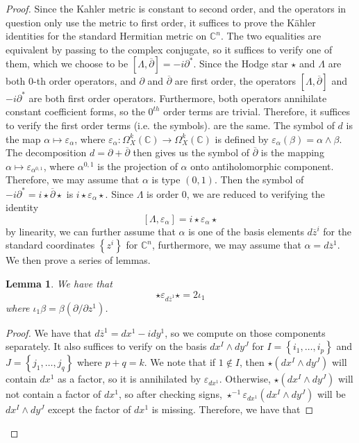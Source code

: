 \documentclass[psamsfonts, 12pt]{amsart}
\newtheorem{lem}[thm]{Lemma}
\theoremstyle{definition}
\theoremstyle{remark}
\newcommand{\C}{\mathbb{C}}
\newcommand{\dbar}{\overline{\partial}}
\newcommand{\zbar}{\overline{z}}
\newcommand{\inv}{^{-1}}
\newcommand{\set}[1]{\left\lbrace #1 \right\rbrace}
\begin{document}
\begin{proof}
Since the Kahler metric is constant to second order, and the operators in question only
use the metric to first order, it suffices to prove the K\"ahler identities for the
standard Hermitian metric on $\C^n$. The two equalities are equivalent by passing to
the complex conjugate, so it suffices to verify one of them, which we choose to
be $[\Lambda, \dbar] = -i\partial^*$. Since the Hodge star $\star$ and $\Lambda$ are
both $0$-th order operators, and $\partial$ and $\dbar$ are first order, the operators
$[\Lambda,\dbar]$ and $-i\partial^*$ are both first order operators. Furthermore, both
operators annihilate constant coefficient forms, so the $0^{th}$ order terms are
trivial. Therefore, it suffices to verify the first order terms (i.e. the symbols).
are the same. The symbol of $d$ is the map $\alpha \mapsto \varepsilon_\alpha$, where
$\varepsilon_\alpha: \Omega^k_X(\C) \to \Omega^k_X(\C)$ is defined by
$\varepsilon_\alpha(\beta) = \alpha\wedge\beta$. The decomposition
$d = \partial + \dbar$ then gives us the symbol of $\dbar$ is the mapping
$\alpha \mapsto \varepsilon_{\alpha^{0,1}}$, where $\alpha^{0,1}$ is the projection of
$\alpha$ onto antiholomorphic component. Therefore, we may assume that $\alpha$ is type
$(0,1)$. Then the symbol of $-i\partial^* = i\star\dbar\star$ is
$i\star\varepsilon_\alpha\star$. Since $\Lambda$ is order $0$, we are reduced
to verifying the identity
\[
[\Lambda,\varepsilon_\alpha] = i\star\varepsilon_\alpha\star
\]
by linearity, we can further assume that $\alpha$ is one of the basis elements
$d\zbar^i$ for the standard coordinates $\set{z^i}$ for $\C^n$, furthermore, we may
assume that $\alpha = d\zbar^1$. We then prove a series of lemmas.
%
\begin{lem}
We have that
\[
\star\varepsilon_{d\zbar^1}\star = 2\iota_1
\]
where $\iota_1\beta = \beta(\partial/\partial z^1)$.
\end{lem}
%
\begin{proof}
We have that $d\zbar^1 = dx^1 - idy^1$, so we compute on those components separately.
It also suffices to verify on the basis $dx^I \wedge dy^J$ for
$I = \set{i_1,\ldots, i_p}$ and $J = \set{j_1,\ldots, j_q}$ where $p+q=k$. We note that
if $1 \notin I$, then $\star(dx^I \wedge dy^J)$ will contain $dx^1$ as a factor,
so it is annihilated by $\varepsilon_{dx^1}$. Otherwise, $\star(dx^I\wedge dy^J)$ will
not contain a factor of $dx^1$, so after checking signs,
$\star\inv\varepsilon_{dx^1}(dx^I\wedge dy^J)$ will be $dx^I \wedge dy^J$ except
the factor of $dx^1$ is missing. Therefore, we have that

\end{proof}
\end{proof}
\end{document}
